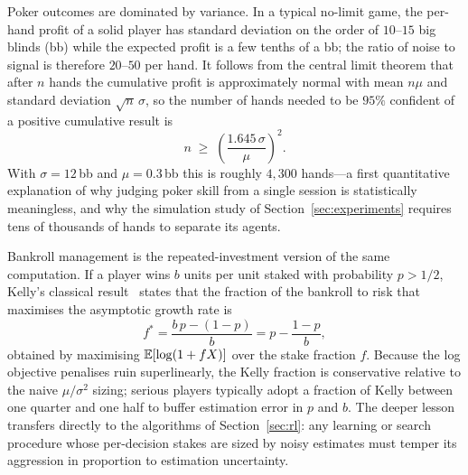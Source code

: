 Poker outcomes are dominated by variance. In a typical no-limit game, the per-hand profit of a solid player has standard deviation on the order of $10$--$15$ big blinds (bb) while the expected profit is a few tenths of a bb; the ratio of noise to signal is therefore $20$--$50$ per hand. It follows from the central limit theorem that after $n$ hands the cumulative profit is approximately normal with mean $n\mu$ and standard deviation $\sqrt{n}\,\sigma$, so the number of hands needed to be $95\%$ confident of a positive cumulative result is
\begin{equation}\label{eq:handsneeded}
n \;\ge\; \left( \frac{1.645\,\sigma}{\mu} \right)^{2} .
\end{equation}
With $\sigma = 12$\,bb and $\mu = 0.3$\,bb this is roughly $4{,}300$ hands---a first quantitative explanation of why judging poker skill from a single session is statistically meaningless, and why the simulation study of Section~\ref{sec:experiments} requires tens of thousands of hands to separate its agents.

Bankroll management is the repeated-investment version of the same computation. If a player wins $b$ units per unit staked with probability $p > 1/2$, Kelly's classical result~\cite{kelly1956new} states that the fraction of the bankroll to risk that maximises the asymptotic growth rate is
\begin{equation}\label{eq:kelly}
f^{*} = \frac{b\,p - (1-p)}{b} = p - \frac{1-p}{b} ,
\end{equation}
obtained by maximising $\operatorname{\mathbb{E}}[\log(1 + f X)]$ over the stake fraction $f$. Because the log objective penalises ruin superlinearly, the Kelly fraction is conservative relative to the naive $\mu/\sigma^{2}$ sizing; serious players typically adopt a fraction of Kelly between one quarter and one half to buffer estimation error in $p$ and $b$. The deeper lesson transfers directly to the algorithms of Section~\ref{sec:rl}: any learning or search procedure whose per-decision stakes are sized by noisy estimates must temper its aggression in proportion to estimation uncertainty.
